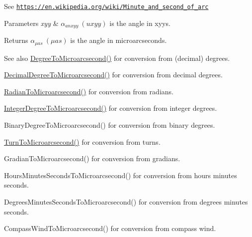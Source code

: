 See \href{https://en.wikipedia.org/wiki/Minute_and_second_of_arc}{\tt https\+://en.\+wikipedia.\+org/wiki/\+Minute\+\_\+and\+\_\+second\+\_\+of\+\_\+arc} 
\begin{DoxyParams}{Parameters}
{\em xyy} & $\alpha_{anxyy}\ (uxyy)$ is the angle in xyys. \\
\hline
\end{DoxyParams}
\begin{DoxyReturn}{Returns}
$\alpha_{\mu as}\ (\mu as)$ is the angle in microarcseconds. 
\end{DoxyReturn}
\begin{DoxySeeAlso}{See also}
\mbox{\hyperlink{group___e_g_x_math-_angle_conversions-_degree_ga31b65388fe1b4656663b3d66b9d764e6}{Degree\+To\+Microarcsecond()}} for conversion from (decimal) degrees. 

\mbox{\hyperlink{group___e_g_x_math-_angle_conversions-_decimal_degree_ga6fa88456069907fd24716fa575517571}{Decimal\+Degree\+To\+Microarcsecond()}} for conversion from decimal degrees. 

\mbox{\hyperlink{group___e_g_x_math-_angle_conversions-_radian_ga3a515ca2838a305fa40750763f546a86}{Radian\+To\+Microarcsecond()}} for conversion from radians. 

\mbox{\hyperlink{group___e_g_x_math-_angle_conversions-_integer_degree_ga69179d6082764595c7014805e1f6b31e}{Integer\+Degree\+To\+Microarcsecond()}} for conversion from integer degrees. 

Binary\+Degree\+To\+Microarcsecond() for conversion from binary degrees. 

\mbox{\hyperlink{group___e_g_x_math-_angle_conversions-_turn_ga41a861a04d65aab05647b32142e6d80d}{Turn\+To\+Microarcsecond()}} for conversion from turns. 

Gradian\+To\+Microarcsecond() for conversion from gradians. 

Hours\+Minutes\+Seconds\+To\+Microarcsecond() for conversion from hours minutes seconds. 

Degrees\+Minutes\+Seconds\+To\+Microarcsecond() for conversion from degrees minutes seconds. 

Compass\+Wind\+To\+Microarcsecond() for conversion from compass wind. 
\end{DoxySeeAlso}
\mbox{\label{group___e_g_x_math-_angle_conversions-_x_z_x_ga164fd354ff7a249d92865b51beca40d2}} 
